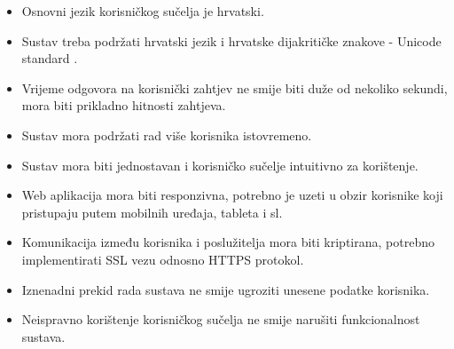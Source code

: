             \begin{itemize}
                \item Osnovni jezik korisničkog sučelja je hrvatski.
                \item Sustav treba podržati hrvatski jezik i hrvatske dijakritičke znakove - Unicode standard .
                \item Vrijeme odgovora na korisnički zahtjev ne smije biti duže od nekoliko sekundi, mora biti prikladno hitnosti zahtjeva.
                \item Sustav mora podržati rad više korisnika istovremeno.
                \item Sustav mora biti jednostavan i korisničko sučelje intuitivno za korištenje.
                \item Web aplikacija mora biti responzivna, potrebno je uzeti u obzir korisnike koji pristupaju putem mobilnih uređaja, tableta i sl.
                \item Komunikacija između korisnika i poslužitelja mora biti kriptirana, potrebno implementirati SSL vezu odnosno HTTPS protokol.
                \item Iznenadni prekid rada sustava ne smije ugroziti unesene podatke korisnika.
                \item Neispravno korištenje korisničkog sučelja ne smije narušiti funkcionalnost sustava.

            \end{itemize}			 
	